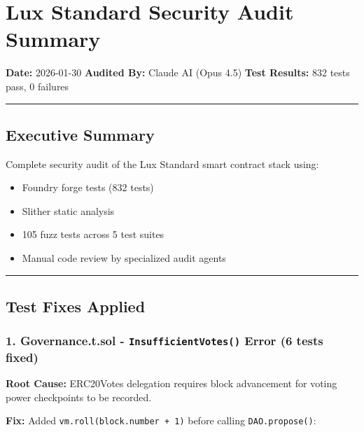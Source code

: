 \documentclass[
]{article}
\author{}
\date{}
\providecommand{\tightlist}{%
  \setlength{\itemsep}{0pt}\setlength{\parskip}{0pt}}
\begin{document}
\section{Lux Standard Security Audit
Summary}\label{lux-standard-security-audit-summary}

\textbf{Date:} 2026-01-30 \textbf{Audited By:} Claude AI (Opus 4.5)
\textbf{Test Results:} 832 tests pass, 0 failures

\begin{center}\rule{0.5\linewidth}{0.5pt}\end{center}

\subsection{Executive Summary}\label{executive-summary}

Complete security audit of the Lux Standard smart contract stack using:

\begin{itemize}
\tightlist
\item
  Foundry forge tests (832 tests)
\item
  Slither static analysis
\item
  105 fuzz tests across 5 test suites
\item
  Manual code review by specialized audit agents
\end{itemize}

\begin{center}\rule{0.5\linewidth}{0.5pt}\end{center}

\subsection{Test Fixes Applied}\label{test-fixes-applied}

\subsubsection{\texorpdfstring{1. Governance.t.sol -
\texttt{InsufficientVotes()} Error (6 tests
fixed)}{1. Governance.t.sol - InsufficientVotes() Error (6 tests fixed)}}\label{1-governancetsol---insufficientvotes-error-6-tests-fixed}

\textbf{Root Cause:} ERC20Votes delegation requires block advancement
for voting power checkpoints to be recorded.

\textbf{Fix:} Added \texttt{vm.roll(block.number\ +\ 1)} before calling
\texttt{DAO.propose()}:
\end{document}

